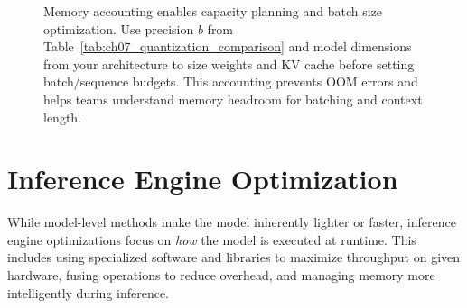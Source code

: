 \begin{figure}[t]
\centering
\begin{llmfigbox}
\end{llmfigbox}
\caption{Memory accounting enables capacity planning and batch size optimization. Use precision $b$ from Table~\ref{tab:ch07_quantization_comparison} and model dimensions from your architecture to size weights and KV cache before setting batch/sequence budgets. This accounting prevents OOM errors and helps teams understand memory headroom for batching and context length.}
\label{fig:ch07_memory_cheatsheet}
\end{figure}

\FloatBarrier
\section{Inference Engine Optimization}
\label{sec:perf-engine}
While model-level methods make the model inherently lighter or faster, inference engine optimizations focus on \emph{how} the model is executed at runtime. This includes using specialized software and libraries to maximize throughput on given hardware, fusing operations to reduce overhead, and managing memory more intelligently during inference.

